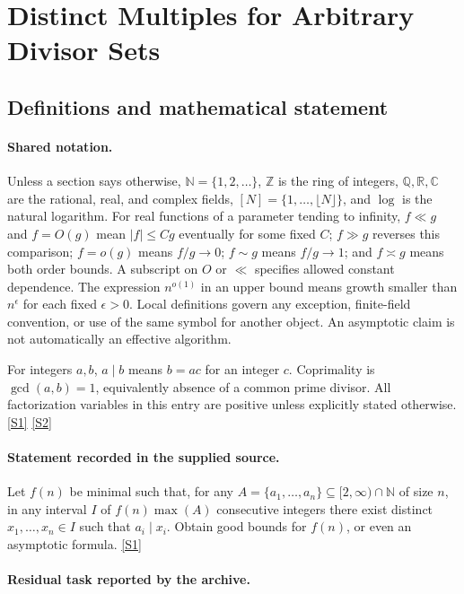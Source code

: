 \documentclass[11pt,a4paper]{article}
\newcommand{\N}{\mathbb{N}}
\newcommand{\Z}{\mathbb{Z}}
\newcommand{\Q}{\mathbb{Q}}
\newcommand{\R}{\mathbb{R}}
\newcommand{\C}{\mathbb{C}}
\newcommand{\sref}[2]{\hyperlink{source:#1:#2}{[S#2]}}
\begin{document}
\section{Distinct Multiples for Arbitrary Divisor Sets}\label{statement}


\subsection{Definitions and mathematical statement}

\paragraph{Shared notation.}Unless a section says otherwise, $\N=\{1,2,\ldots\}$,
$\Z$ is the ring of integers, $\Q,\R,\C$ are the rational, real, and complex
fields, $[N]=\{1,\ldots,\lfloor N\rfloor\}$, and $\log$ is the natural
logarithm. For real functions of a parameter tending to infinity,
$f\ll g$ and $f=O(g)$ mean $|f|\leq Cg$ eventually for some fixed $C$;
$f\gg g$ reverses this comparison; $f=o(g)$ means $f/g\to0$;
$f\sim g$ means $f/g\to1$; and $f\asymp g$ means both order bounds.
A subscript on $O$ or $\ll$ specifies allowed constant dependence.
The expression $n^{o(1)}$ in an upper bound means growth smaller than
$n^\epsilon$ for each fixed $\epsilon>0$. Local definitions govern any
exception, finite-field convention, or use of the same symbol for another
object. An asymptotic claim is not automatically an effective algorithm.



For integers $a,b$, $a\mid b$ means $b=ac$ for an integer $c$. Coprimality is $\gcd(a,b)=1$, equivalently absence of a common prime divisor. All factorization variables in this entry are positive unless explicitly stated otherwise. \sref{statement}{1} \sref{statement}{2}

\paragraph{Statement recorded in the supplied source.}
Let $f(n)$ be minimal such that, for any $A=\{a_1,\ldots,a_n\}\subseteq [2,\infty)\cap\mathbb{N}$ of size $n$, in any interval $I$ of $f(n)\max(A)$ consecutive integers there exist distinct $x_1,\ldots,x_n\in I$ such that $a_i\mid x_i$.
Obtain good bounds for $f(n)$, or even an asymptotic formula. \sref{statement}{1}

\paragraph{Residual task reported by the archive.}
\end{document}
